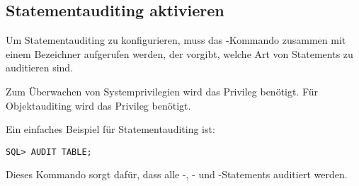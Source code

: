       \subsection{Statementauditing aktivieren}
        \label{statementauditing}
        Um Statementauditing zu konfigurieren, muss das -Kommando zusammen mit einem Bezeichner aufgerufen werden, der vorgibt, welche Art von Statements zu auditieren sind.
        \begin{merke}
          Zum Überwachen von Systemprivilegien wird das Privileg  benötigt. Für Objektauditing wird das Privileg  benötigt.
        \end{merke}
        Ein einfaches Beispiel für Statementauditing ist:
        \begin{lstlisting}[caption={Statementauditing aktivieren},label=admin802,language=oracle_sql]
SQL> AUDIT TABLE;
        \end{lstlisting}
        Dieses Kommando sorgt dafür, dass alle -, - und -State\-ments auditiert werden.

        \begin{literaturinternet}
          \item \cite{i2059073}
        \end{literaturinternet}

